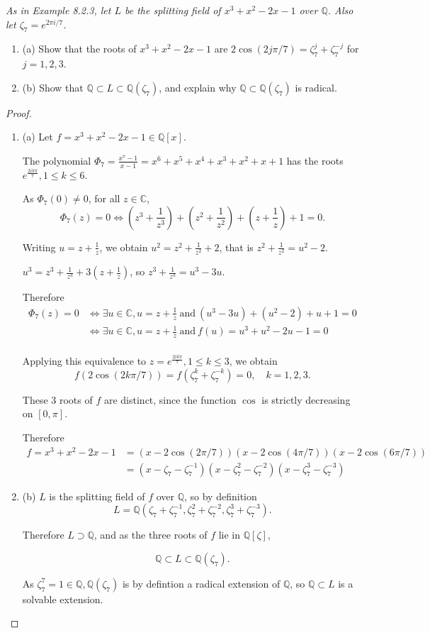 \documentclass[11pt,a4paper]{article}
\newcommand{\be} {\begin{enumerate}}
\newcommand{\ee} {\end{enumerate}}
\newcommand{\Q}{\mathbb{Q}}
\begin{document}
{\it As in Example 8.2.3, let $L$ be the splitting field of $x^3+x^2-2x-1$ over $\Q$. Also let $\zeta_7 = e^{2\pi i/7}$.
\be
\item[(a)] Show that the roots of $x^3+x^2-2x-1$ are $2\cos(2j\pi/7) = \zeta_7^j + \zeta_7^{-j}$ for $j=1,2,3$.
\item[(b)] Show that $\Q \subset L \subset \Q(\zeta_7)$, and explain why $\Q \subset \Q(\zeta_7)$ is radical.
\ee
}

\begin{proof}
\be
\item[(a)] Let $f = x^3+x^2-2x-1\in \mathbb{Q}[x]$.

The polynomial $\Phi_7 = \frac{x^7-1}{x-1} = x^6+x^5+x^4+x^3+x^2+x+1$ has the roots $e^{\frac{2ik\pi}{7}}, {1 \leq k \leq 6}$.

As $\Phi_7(0) \neq  0$, for all $z \in \mathbb{C}$,
$$ \Phi_7(z) = 0 \iff \left(z^3 + \frac{1}{z^3}\right) + \left(z^2+\frac{1}{z^2}\right) + \left(z + \frac{1}{z}\right) +1 = 0.$$

Writing $u = z + \frac{1}{z}$, we obtain $u^2 = z^2+\frac{1}{z^2} + 2$, that is  $z^2+\frac{1}{z^2} = u^2-2$.

$u^3 = z^3 + \frac{1}{z^3} + 3(z + \frac{1}{z})$, so $z^3 + \frac{1}{z^3} = u^3 - 3u$.

Therefore
\begin{align*}
\Phi_7(z) = 0 &\iff \exists u \in \mathbb{C}, u =z + \frac{1}{z}\  \mathrm{and} \ (u^3 - 3u) + (u^2 - 2) +u+1 = 0\\
&\iff\exists u \in \mathbb{C}, u =z + \frac{1}{z}\  \mathrm{and} \ f(u)=u^3 + u^2 - 2u -1 = 0\\
\end{align*}

Applying this equivalence to $z = e^{\frac{2ik\pi}{7}}, 1 \leq k \leq 3$, we obtain $$f(2\cos(2k\pi/7))=f(\zeta_7^k + \zeta_7^{-k})=0,\quad  k = 1,2,3.$$

These 3 roots of $f$ are distinct, since the function $\cos$ is strictly decreasing on $[0,\pi]$.

Therefore 
\begin{align*}
f = x^3+x^2-2x-1 &= (x -2\cos(2\pi/7)) (x -2\cos(4\pi/7)) (x -2\cos(6\pi/7))\\
&= (x-\zeta_7-\zeta_7^{-1}) (x-\zeta_7^2-\zeta_7^{-2}) (x-\zeta_7^3-\zeta_7^{-3})
\end{align*}

\item[(b)] $L$ is the splitting field of $f$ over $\mathbb{Q}$, so by definition $$L = \mathbb{Q}(\zeta_7+\zeta_7^{-1},\zeta_7^2+\zeta_7^{-2},\zeta_7^3+\zeta_7^{-3}).$$

Therefore $L\supset \mathbb{Q}$, and as the three roots of $f$ lie in $\mathbb{Q}[\zeta]$,

$$\mathbb{Q} \subset L \subset \mathbb{Q}(\zeta_7).$$

As $\zeta_7^7 = 1 \in \mathbb{Q}, \mathbb{Q}(\zeta_7)$ is by defintion a radical extension of $\mathbb{Q}$, so $\Q \subset L$ is a solvable extension.
\ee
\end{proof}
\end{document}
